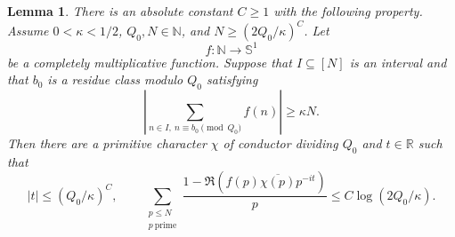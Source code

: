 \documentclass[twoside]{aomart}
\theoremstyle{paperplain}
\newtheorem{lemma}[theorem]{Lemma}
\theoremstyle{paperdefinition}
\numberwithin{equation}{section}
\begin{document}
\begin{lemma}\label{sc:residue-mean}
There is an absolute constant $C\ge1$ with the following property.
Assume $0<\kappa<1/2$, $Q_0,N\in\mathbb N$, and
$N\ge(2Q_0/\kappa)^C$. Let
\[
 f:\mathbb N\longrightarrow\mathbb S^1
\]
be a completely multiplicative function. Suppose that $I\subseteq[N]$
is an interval and that $b_0$ is a residue class modulo $Q_0$ satisfying
\begin{equation*}
 \left|\sum_{n\in I,\ n\equiv b_0\pmod{Q_0}}f(n)\right|\ge\kappa N.
\end{equation*} Then there are a primitive character $\chi$ of conductor dividing
$Q_0$ and $t\in\mathbb R$ such that
\begin{equation*}
 |t|\le(Q_0/\kappa)^C,
 \qquad \sum_{\substack{p\le N\\p\ \mathrm{prime}}}\frac{1-\Re(f(p)\overline{\chi(p)}p^{-it})}{p}
 \le C\log(2Q_0/\kappa).
\end{equation*}
\end{lemma}
\end{document}
